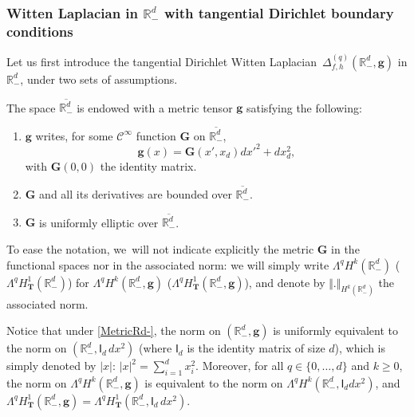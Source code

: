 \documentclass[10pt]{amsart}
\newenvironment{enumeratei}
{\bgroup\def\theenumi{\roman{enumi}}\def\theenumii{\arabic{enumii}}\begin{enumerate}}
{\end{enumerate}\egroup}
\newcommand{\mbf}[1]{\mathbf{#1}}
\theoremstyle{plain}
\theoremstyle{definition}
\newenvironment{manualassumption}[1]{%
\renewcommand\themanualassumptioninner{#1}%
\manualassumptioninner}{\endmanualassumptioninner}
\begin{document}
\subsubsection{Witten Laplacian in $\mathbb R^d_-$ with tangential
Dirichlet boundary conditions}\label{sec.Rdmoins_main}
Let us first introduce the tangential
Dirichlet Witten
Laplacian~$\Delta_{f,h}^{(q)} (\mathbb R^d_-,\mbf g)$ in $ \mathbb
R^d_-$, under two sets of assumptions.

\begin{manualassumption}{$(\textup{Metric-}\mathbb R^{d}_-)$}\label{MetricRd-}
The space $\overline{\mathbb R^d_-}$ is endowed with a metric
tensor $\mbf g$ satisfying the following:
\begin{enumeratei}
\item\label{MetricRd-i}
$\mbf g$ writes, for some $\mathcal C^\infty$ function
$\mbf G$ on $\overline{\mathbb R^d_-}$,
\begin{equation}\label{eq.outc2}
\mbf g(x) = {\mbf G}(x',x_d)dx'^2+dx_d^2,
\end{equation}
with ${\mbf G}(0,0)$ the identity matrix.
\item\label{MetricRd-ii}
${\mbf G}$ and all its derivatives are bounded over $\overline{\mathbb R^d_-}$.
\item\label{MetricRd-iii}
${\mbf G}$ is uniformly elliptic over $\overline{\mathbb R^d_-}$.
\end{enumeratei}
\end{manualassumption}

To ease the notation, we~will not indicate explicitly the metric ${\mbf G}$ in the
functional spaces nor in the associated norm: we will simply write $ \Lambda^qH^k(\mathbb
R^{d}_-)$ (\resp $\Lambda^qH^1_{\mbf T}(\mathbb R^d_-)$) for
$\Lambda^qH^k(\mathbb R^{d}_-,\mbf g)$ (\resp $\Lambda^qH^1_{\mbf
T}(\mathbb R^d_-,\mbf g)$), and denote by $ \Vert. \Vert_{H^k(\mathbb R^{d}_-)}$ the associated norm.

Notice that under \ref{MetricRd-}, the norm on $(\mathbb R^d_-,
\mbf g)$ is uniformly equivalent to the norm on $(\mathbb R^d_-,
\mathsf I_{d} \, dx^2)$ (where
$\mathsf I_{d}$ is the identity matrix of size $d$), which is simply denoted by $\vert x \vert$: $\vert x\vert^2=\sum_{i=1}^{d}x_i^2$.
Moreover, for all $q\in \{0,\ldots,d\}$ and $k\ge 0$, the norm on $\Lambda^qH^k(\mathbb R^d_-,\mbf g)$ is equivalent to the norm on $\Lambda^qH^k(\mathbb R^d_-, \mathsf I_d dx^2)$, and
$\Lambda^qH^1_{\mbf T}(\mathbb R^d_-,\mbf g)=\Lambda^qH^1_{\mbf T}(\mathbb R^d_-, \mathsf I_{d} \, dx^2)$.
\end{document}

